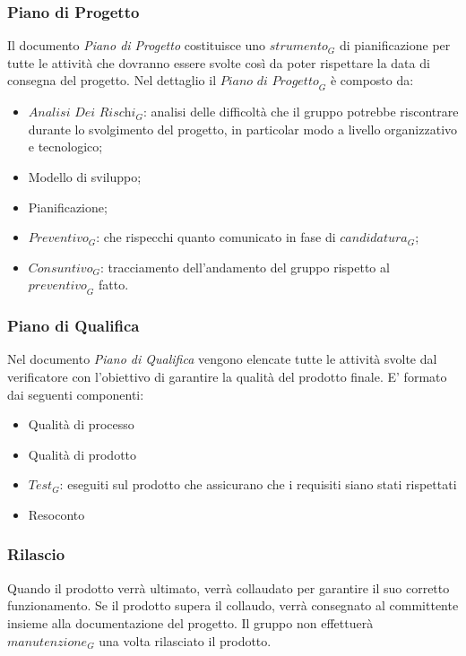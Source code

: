 \subsubsection{Piano di Progetto}
Il documento \textit{Piano di Progetto} costituisce uno $\textit{strumento}_G$ di pianificazione per tutte le attività che dovranno essere svolte così da poter rispettare la data di consegna del progetto.
Nel dettaglio il $\textit{Piano di Progetto}_G$ è composto da:
\begin{itemize}
    \item $\textit{Analisi Dei Rischi}_G$: analisi delle difficoltà che il gruppo potrebbe riscontrare durante lo svolgimento del progetto, in particolar modo a livello organizzativo e tecnologico;
    \item Modello di sviluppo;
    \item Pianificazione;
    \item $\textit{Preventivo}_G$: che rispecchi quanto comunicato in fase di $\textit{candidatura}_G$;
    \item $\textit{Consuntivo}_G$: tracciamento dell'andamento del gruppo rispetto al $\textit{preventivo}_G$ fatto.
\end{itemize}
\subsubsection{Piano di Qualifica}
Nel documento \textit{Piano di Qualifica} vengono elencate tutte le attività svolte dal verificatore con l'obiettivo di garantire la qualità del prodotto finale.
E' formato dai seguenti componenti:
\begin{itemize}
    \item Qualità di processo
    \item Qualità di prodotto
    \item $\textit{Test}_G$: eseguiti sul prodotto che assicurano che i requisiti siano stati rispettati
    \item Resoconto
\end{itemize}
\subsubsection{Rilascio}
Quando il prodotto verrà ultimato, verrà collaudato per garantire il suo corretto funzionamento. Se il prodotto supera il collaudo, verrà consegnato al committente insieme alla documentazione del progetto. 
Il gruppo non effettuerà $\textit{manutenzione}_G$ una volta rilasciato il prodotto.

